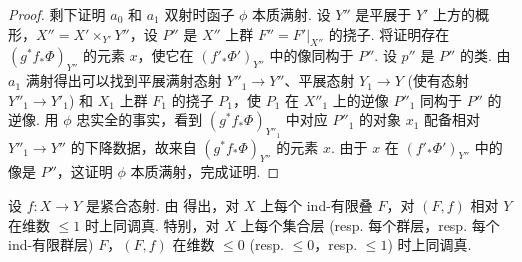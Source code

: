 \begin{proof}
剩下证明 $a_0$ 和 $a_1$ 双射时函子 $\phi$ 本质满射. 设 $Y''$ 是平展于 $Y'$ 上方的概形，$X'' = X' \times_{Y'} Y''$，设 $P''$ 是 $X''$ 上群 $F'' = F'|_{X''}$ 的挠子. 将证明存在 $(g^{*} f_* \Phi)_{Y''}$ 的元素 $x$，使它在 $(f'_* \Phi')_{Y''}$ 中的像同构于 $P''$. 设 $p''$ 是 $P''$ 的类. 由 $a_1$ 满射得出可以找到平展满射态射 $Y''_1 \to Y''$、平展态射 $Y_1 \to Y$ (使有态射 $Y''_1 \to Y'_1$) 和 $X_1$ 上群 $F_1$ 的挠子 $P_1$，使 $P_1$ 在 $X''_1$ 上的逆像 $P''_1$ 同构于 $P''$ 的逆像. 用 $\phi$ 忠实全的事实，看到 $(g^{*} f_* \Phi)_{Y''_1}$ 中对应 $P''_1$ 的对象 $x_1$ 配备相对 $Y''_1 \to Y''$ 的下降数据，故来自 $(g^{*} f_* \Phi)_{Y''}$ 的元素 $x$. 由于 $x$ 在 $(f'_* \Phi')_{Y''}$ 中的像是 $P''$，这证明 $\phi$ 本质满射，完成证明.
\end{proof}

\begin{example}\label{exa:XIII.1.4}
设 $f \colon X \to Y$ 是紧合态射. 由 \cite[VII 2.2.2]{exp13-2} 得出，对 $X$ 上每个 ind-有限叠 $F$，对 $(F, f)$ 相对 $Y$ 在维数 $\leqslant 1$ 时上同调真. 特别，对 $X$ 上每个集合层 (resp. 每个群层，resp. 每个 ind-有限群层) $F$，$(F, f)$ 在维数 $\leqslant 0$ (resp. $\leqslant 0$，resp. $\leqslant 1$) 时上同调真.
\end{example}

